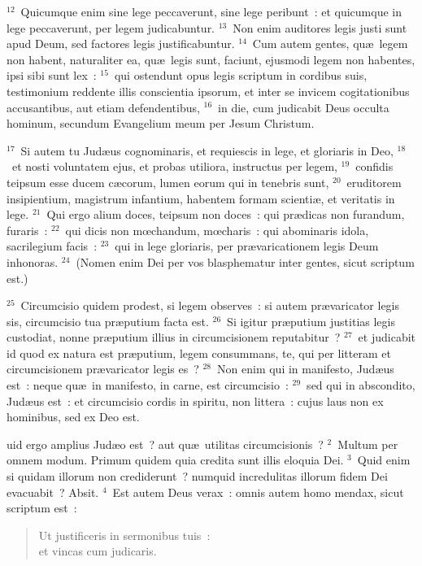 ${}^{12}$~Quicumque enim sine lege peccaverunt, sine lege peribunt~: et quicumque in lege peccaverunt, per legem judicabuntur.
${}^{13}$~Non enim auditores legis justi sunt apud Deum, sed factores legis justificabuntur.
${}^{14}$~Cum autem gentes, qu\ae\ legem non habent, naturaliter ea, qu\ae\ legis sunt, faciunt, ejusmodi legem non habentes, ipsi sibi sunt lex~:
${}^{15}$~qui ostendunt opus legis scriptum in cordibus suis, testimonium reddente illis conscientia ipsorum, et inter se invicem cogitationibus accusantibus, aut etiam defendentibus,
${}^{16}$~in die, cum judicabit Deus occulta hominum, secundum Evangelium meum per Jesum Christum.


${}^{17}$~Si autem tu Jud\ae us cognominaris, et requiescis in lege, et gloriaris in Deo,
${}^{18}$~et nosti voluntatem ejus, et probas utiliora, instructus per legem,
${}^{19}$~confidis teipsum esse ducem c\ae corum, lumen eorum qui in tenebris sunt,
${}^{20}$~eruditorem insipientium, magistrum infantium, habentem formam scienti\ae , et veritatis in lege.
${}^{21}$~Qui ergo alium doces, teipsum non doces~: qui pr\ae dicas non furandum, furaris~:
${}^{22}$~qui dicis non mœchandum, mœcharis~: qui abominaris idola, sacrilegium facis~:
${}^{23}$~qui in lege gloriaris, per pr\ae varicationem legis Deum inhonoras.
${}^{24}$~(Nomen enim Dei per vos blasphematur inter gentes, sicut scriptum est.)


${}^{25}$~Circumcisio quidem prodest, si legem observes~: si autem pr\ae varicator legis sis, circumcisio tua pr\ae putium facta est.
${}^{26}$~Si igitur pr\ae putium justitias legis custodiat, nonne pr\ae putium illius in circumcisionem reputabitur~?
${}^{27}$~et judicabit id quod ex natura est pr\ae putium, legem consummans, te, qui per litteram et circumcisionem pr\ae varicator legis es~?
${}^{28}$~Non enim qui in manifesto, Jud\ae us est~: neque qu\ae\ in manifesto, in carne, est circumcisio~:
${}^{29}$~sed qui in abscondito, Jud\ae us est~: et circumcisio cordis in spiritu, non littera~: cujus laus non ex hominibus, sed ex Deo est.

\bchapter
{}uid ergo amplius Jud\ae o est~? aut qu\ae\ utilitas circumcisionis~?
${}^{2}$~Multum per omnem modum. Primum quidem quia credita sunt illis eloquia Dei.
${}^{3}$~Quid enim si quidam illorum non crediderunt~? numquid incredulitas illorum fidem Dei evacuabit~? Absit.
${}^{4}$~Est autem Deus verax~: omnis autem homo mendax, sicut scriptum est~: \begin{flushleft}\begin{verse}Ut justificeris in sermonibus tuis~:\\ et vincas cum judicaris.\end{verse}\end{flushleft}


